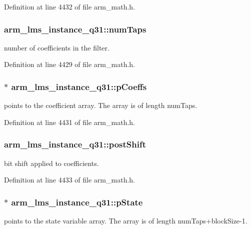 Definition at line 4432 of file arm\-\_\-math.\-h.

\hypertarget{structarm__lms__instance__q31_ac0d84f7d054555931ef8a62511fbcb8a}{
\subsubsection[{num\-Taps}]{ arm\-\_\-lms\-\_\-instance\-\_\-q31\-::num\-Taps}}\label{structarm__lms__instance__q31_ac0d84f7d054555931ef8a62511fbcb8a}
number of coefficients in the filter. 

Definition at line 4429 of file arm\-\_\-math.\-h.

\hypertarget{structarm__lms__instance__q31_a4afe56e991a5416adfd462aa88bda500}{
\subsubsection[{p\-Coeffs}]{$\ast$ arm\-\_\-lms\-\_\-instance\-\_\-q31\-::p\-Coeffs}}\label{structarm__lms__instance__q31_a4afe56e991a5416adfd462aa88bda500}
points to the coefficient array. The array is of length num\-Taps. 

Definition at line 4431 of file arm\-\_\-math.\-h.

\hypertarget{structarm__lms__instance__q31_a4705a8f0011bb9166e09bf5bd51e595e}{
\subsubsection[{post\-Shift}]{ arm\-\_\-lms\-\_\-instance\-\_\-q31\-::post\-Shift}}\label{structarm__lms__instance__q31_a4705a8f0011bb9166e09bf5bd51e595e}
bit shift applied to coefficients. 

Definition at line 4433 of file arm\-\_\-math.\-h.

\hypertarget{structarm__lms__instance__q31_a206d47b49de6f357f933ebe61520753c}{
\subsubsection[{p\-State}]{$\ast$ arm\-\_\-lms\-\_\-instance\-\_\-q31\-::p\-State}}\label{structarm__lms__instance__q31_a206d47b49de6f357f933ebe61520753c}
points to the state variable array. The array is of length num\-Taps+block\-Size-\/1. 

